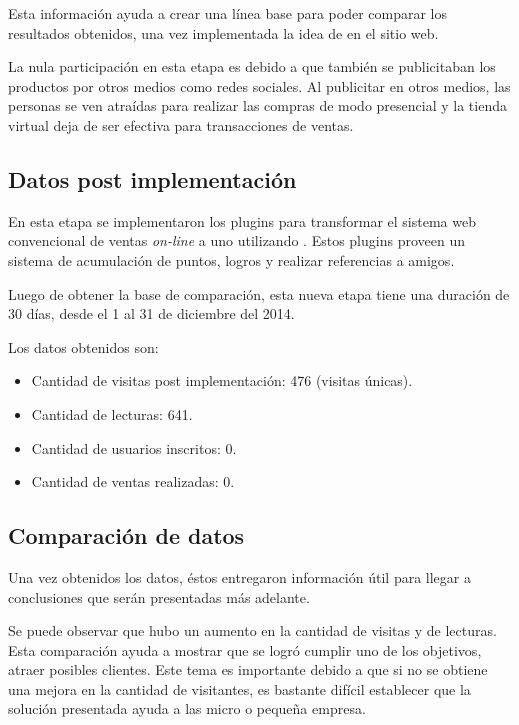 Esta información ayuda a crear una línea base para poder comparar los
resultados obtenidos, una vez implementada la idea de {\gam} en el sitio web.

La nula participación en esta etapa es debido a que también se publicitaban
los productos por otros medios como redes sociales. Al publicitar en otros medios, 
las personas se ven atraídas para realizar las compras de modo presencial y la 
tienda virtual deja de ser efectiva para transacciones de ventas.

\subsection{Datos post implementación {\gam}}

En esta etapa se implementaron los plugins para transformar el sistema web
convencional de ventas \emph{on-line} a uno utilizando {\gam}.
Estos plugins proveen un sistema de acumulación de puntos,
logros y realizar referencias a amigos.

Luego de obtener la base de comparación, esta nueva etapa tiene una duración
de 30 días, desde el 1 al 31 de diciembre del 2014.

Los datos obtenidos son:

\begin{itemize}
    \item Cantidad de visitas post implementación: 476 (visitas únicas).
    \item Cantidad de lecturas: 641.
    \item Cantidad de usuarios inscritos: 0.
    \item Cantidad de ventas realizadas: 0.
\end{itemize}

\subsection{Comparación de datos}

Una vez obtenidos los datos, éstos entregaron información útil para llegar a
conclusiones que serán presentadas más adelante.

Se puede observar que hubo un aumento en la cantidad de visitas y de lecturas.
Esta comparación ayuda a mostrar que se logró cumplir uno de los objetivos,
atraer posibles clientes.
Este tema es importante debido a que si no se obtiene una mejora en la cantidad
de visitantes, es bastante difícil establecer que la solución presentada ayuda
a las micro o pequeña empresa.

